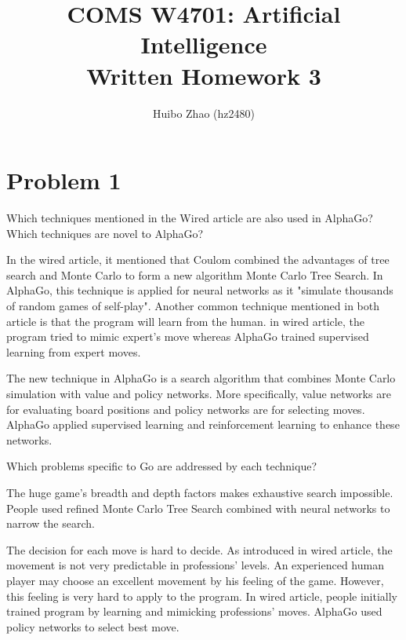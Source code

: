 \documentclass[11pt]{article}
\begin{document}
 
 
\title{COMS W4701: Artificial Intelligence\\
       Written Homework 3}
\author{Huibo Zhao (hz2480)} %
\maketitle

\section*{Problem 1} 
 

Which techniques mentioned in the Wired article are also used in AlphaGo? Which techniques are novel to AlphaGo? \newline

In the wired article, it mentioned that Coulom combined the advantages of tree search and Monte Carlo to form a new algorithm Monte Carlo Tree Search. In AlphaGo, this technique is applied for neural networks as it "simulate thousands of random games of self-play". Another common technique mentioned in both article is that the program will learn from the human. in wired article, the program tried to mimic expert's move whereas AlphaGo trained supervised learning from expert moves.\newline

The new technique in AlphaGo is a search algorithm that combines Monte Carlo simulation with value and policy networks. More specifically, value networks are for evaluating board positions and policy networks are for selecting moves. AlphaGo applied supervised learning and reinforcement learning to enhance these networks. \newline
\newline

\noindent
Which problems specific to Go are addressed by each technique? \newline

The huge game's breadth and depth factors makes exhaustive search impossible. People used refined Monte Carlo Tree Search combined with neural networks to narrow the search. \newline

The decision for each move is hard to decide. As introduced in wired article, the movement is not very predictable in professions' levels. An experienced human player may choose an excellent movement by his feeling of the game. However, this feeling is very hard to apply to the program. In wired article, people initially trained program by learning and mimicking professions' moves. AlphaGo used policy networks to select best move. \newline
\end{document}
